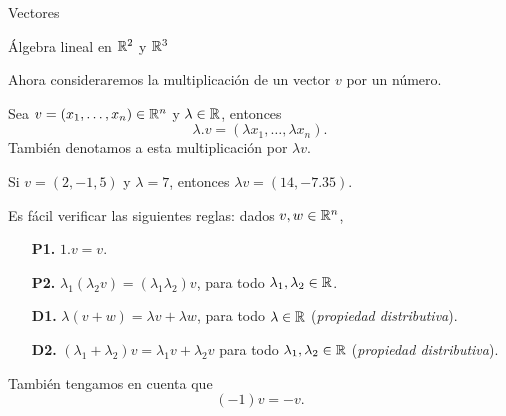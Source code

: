 \begin{chapter}{Vectores}
\begin{section}{\'Algebra lineal en $\mathbb R^2$ y $\mathbb R^3$}
    

    Ahora consideraremos la multiplicación de un vector $v$ por un número. 
    
    \begin{definicion}\label{def-producto-escalar-x-rn}
        Sea $v = (x_1,\ldots,x_n) \in \mathbb R^n$ y $\lambda \in \mathbb R$, entonces
        \begin{equation*}
            \lambda.v = (\lambda x_1,\ldots,\lambda x_n).
        \end{equation*}  
        También denotamos a esta multiplicación por $\lambda v$.
    \end{definicion}

    \begin{ejemplo*}
         Si $v= (2, -1,5)$  y $\lambda = 7$, entonces $\lambda v = (14, -7.35)$.
    \end{ejemplo*}
    
    Es fácil verificar las siguientes reglas: dados $v,w \in \mathbb R^n$, 
    \begin{enumerate}
        \item[\textbf{P1.}] $1.v=v$.
        \item[\textbf{P2.}] $\lambda_1(\lambda_2v) = (\lambda_1\lambda_2)v$, para todo $\lambda_1,\lambda_2 \in \mathbb R$.
        \item[\textbf{D1.}] $\lambda(v+w) = \lambda v +\lambda w$, para todo $\lambda \in \mathbb R$  (\textit{propiedad distributiva}).
        \item[\textbf{D2.}] $(\lambda_1+\lambda_2)v = \lambda_1v + \lambda_2 v$ para todo $\lambda_1,\lambda_2 \in \mathbb R$  (\textit{propiedad distributiva}).
    \end{enumerate}

    También tengamos en cuenta que 
    \begin{equation*}
        (-1)v = -v.
    \end{equation*}
    

\end{section}
\end{chapter}
